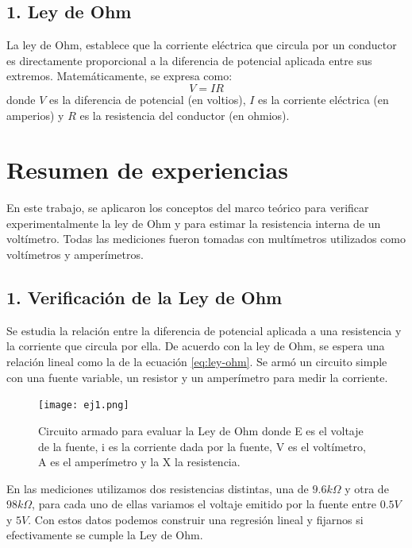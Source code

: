 \documentclass[11pt]{article}
\begin{document}
\subsection*{1. Ley de Ohm}

La ley de Ohm, establece que la corriente eléctrica que circula por un conductor es directamente proporcional a la diferencia de potencial aplicada entre sus extremos. Matemáticamente, se expresa como:
\begin{equation}
V = I R
\label{eq:ley-ohm}
\end{equation}
donde \( V \) es la diferencia de potencial (en voltios), \( I \) es la corriente eléctrica (en amperios) y \( R \) es la resistencia del conductor (en ohmios).


\section*{Resumen de experiencias}
En este trabajo, se aplicaron los conceptos del marco teórico para verificar experimentalmente la ley de Ohm y para estimar la resistencia interna de un voltímetro. Todas las mediciones fueron tomadas con multímetros utilizados como voltímetros y amperímetros.

\subsection*{1. Verificación de la Ley de Ohm}

Se estudia la relación entre la diferencia de potencial aplicada a una resistencia y la corriente que circula por ella. De acuerdo con la ley de Ohm, se espera una relación lineal como la de la ecuación \ref{eq:ley-ohm}. Se armó un circuito simple con una fuente variable, un resistor y un amperímetro para medir la corriente.

\begin{figure}[H]
    \centering
    \texttt{[image: ej1.png]}
    \caption{Circuito armado para evaluar la Ley de Ohm donde E es el voltaje de la fuente, i es la corriente dada por la fuente, V es el voltímetro, A es el amperímetro y la X la resistencia.}
    \label{fig:ej1}
\end{figure}

En las mediciones utilizamos dos resistencias distintas, una de $9.6k\Omega$ y otra de $98k\Omega$, para cada uno de ellas variamos el voltaje emitido por la fuente entre $0.5V$ y $5V$. Con estos datos podemos construir una regresión lineal y fijarnos si efectivamente se cumple la Ley de Ohm. 
\end{document}
